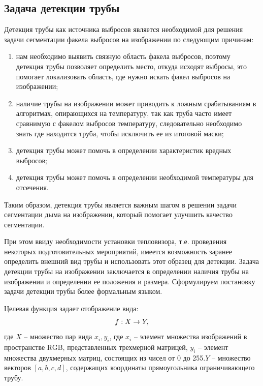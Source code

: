\documentclass[14pt, a4paper]{extreport}
\begin{document}
	\subsection{Задача детекции трубы}
	Детекция трубы как источника выбросов является необходимой для решения задачи сегментации факела выбросов на изображении по следующим причинам:
	\begin{enumerate}[label={\arabic*)}]
		\item нам необходимо выявить связную область факела выбросов, поэтому детекция трубы позволяет определить место, откуда исходят выбросы, это помогает локализовать область, где нужно искать факел выбросов на изображении;
		\item наличие трубы на изображении может приводить к ложным срабатываниям в алгоритмах, опирающихся на температуру, так как труба часто имеет сравнимую с факелом выбросов температуру, следовательно необходимо знать где находится труба, чтобы исключить ее из итоговой маски;
		\item детекция трубы может помочь в определении характеристик вредных выбросов; 
		\item детекция трубы может помочь в определении необходимой температуры для отсечения. 
	\end{enumerate}
	Таким образом, детекция трубы является важным шагом в решении задачи сегментации дыма на изображении, который помогает улучшить качество сегментации.
	
	При этом ввиду необходимости установки тепловизора, т.е. проведения некоторых подготовительных мероприятий, имеется возможность заранее определить внешний вид трубы и использовать этот образец для детекции. Задача детекции трубы на изображении заключается в определении наличия трубы на изображении и определении ее положения и размера. Сформулируем постановку задачи детекции трубы более формальным языком.
	
	Целевая функция задает отображение вида:
	\vspace*{-0.2cm}
	\begin{equation}
		f : X \rightarrow Y,
		\label{f:x->[4]}
		\vspace*{-0.4cm}
	\end{equation}
	где $X$ -- множество пар вида $x_i, y_i$, где $x_i$ -- элемент множества изображений в пространстве RGB, представленных трехмерной матрицей, $y_i$ -- элемент множества двухмерных матриц, состоящих из чисел от 0 до 255.\linebreak $Y$ -- множество векторов $[a, b, c, d]$, содержащих координаты прямоугольника ограничивающего трубу. 
	
\end{document}
